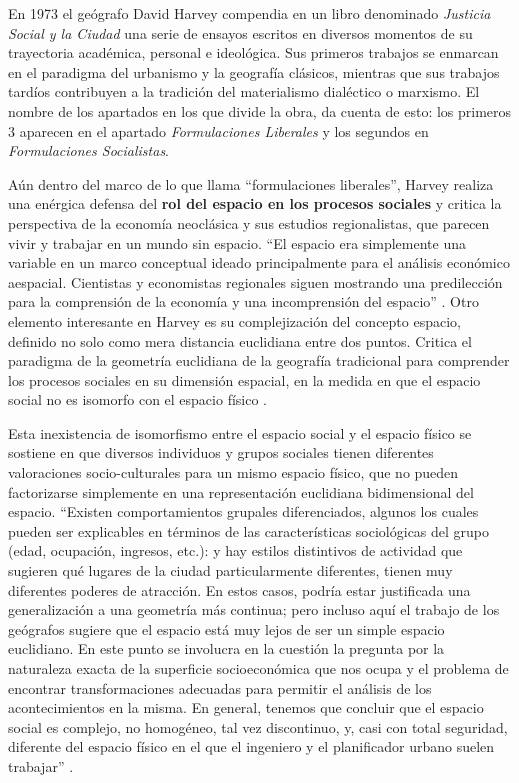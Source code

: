 En 1973 el geógrafo David Harvey compendia en un libro denominado \textit{Justicia Social y la Ciudad} una serie de ensayos escritos en diversos momentos de su trayectoria académica, personal e ideológica. Sus primeros trabajos se enmarcan en el paradigma del urbanismo y la geografía clásicos, mientras que sus trabajos tardíos contribuyen a la tradición del materialismo dialéctico o marxismo. El nombre de los apartados en los que divide la obra, da cuenta de esto: los primeros 3 aparecen en el apartado \textit{Formulaciones Liberales} y los segundos en \textit{Formulaciones Socialistas}.  

Aún dentro del marco de lo que llama “formulaciones liberales”, Harvey realiza una enérgica defensa del \textbf{rol del espacio en los procesos sociales} y critica la perspectiva de la economía neoclásica y sus estudios regionalistas, que parecen vivir y trabajar en un mundo sin espacio. “El espacio era simplemente una variable en un marco conceptual ideado principalmente para el análisis económico aespacial. Cientistas y economistas regionales siguen mostrando una predilección para la comprensión de la economía y una incomprensión del espacio” \cite[~26]{harvey}. Otro elemento interesante en Harvey es su complejización del concepto espacio, definido no solo como mera distancia euclidiana entre dos puntos. Critica el paradigma de la geometría euclidiana de la geografía tradicional para comprender los procesos sociales en su dimensión espacial, en la medida en que el espacio social no es isomorfo con el espacio físico \cite[~29]{harvey}.

Esta inexistencia de isomorfismo entre el espacio social y el espacio físico se sostiene en que diversos individuos y grupos sociales tienen diferentes valoraciones socio-culturales para un mismo espacio físico, que no pueden factorizarse simplemente en una representación euclidiana bidimensional del espacio. “Existen comportamientos grupales diferenciados, algunos los cuales pueden ser explicables en términos de las características sociológicas del grupo (edad, ocupación, ingresos, etc.): y hay estilos distintivos de actividad que sugieren qué lugares de la ciudad particularmente diferentes, tienen muy diferentes poderes de atracción. En estos casos, podría estar justificada una generalización a una geometría más continua; pero incluso aquí el trabajo de los geógrafos sugiere que el espacio está muy lejos de ser un simple espacio euclidiano. En este punto se involucra en la cuestión la pregunta por la naturaleza exacta de la superficie socioeconómica que nos ocupa y el problema de encontrar transformaciones adecuadas para permitir el análisis de los acontecimientos en la misma. En general, tenemos que concluir que el espacio social es complejo, no homogéneo, tal vez discontinuo, y, casi con total seguridad, diferente del espacio físico en el que el ingeniero y el planificador urbano suelen trabajar” \cite[~35]{harvey}.

